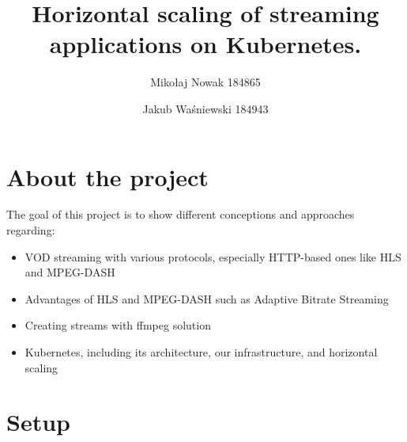 \documentclass{article}
\title{Horizontal scaling of streaming applications on Kubernetes.}
\author{Mikołaj Nowak 184865 \and Jakub Waśniewski 184943}
\date{}
\begin{document}
\maketitle

\section{About the project}\label{about-the-project}

The goal of this project is to show different conceptions and approaches regarding:
\begin{itemize}
  \item VOD streaming with various protocols, especially HTTP-based ones like HLS and MPEG-DASH
  \item Advantages of HLS and MPEG-DASH such as Adaptive Bitrate Streaming
  \item Creating streams with ffmpeg solution
  \item Kubernetes, including its architecture, our infrastructure, and horizontal scaling
\end{itemize}

\section{Setup}\label{setup}
\end{document}
